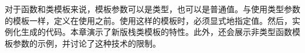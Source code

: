 对于函数和类模板来说，模板参数可以是类型，也可以是普通值。与使用类型参数的模板一样，定义在使用之前。使用这样的模板时，必须显式地指定值。然后，实例化生成的代码。本章演示了新版栈类模板的特性。此外，还会展示非类型函数模板参数的示例，并讨论了这种技术的限制。